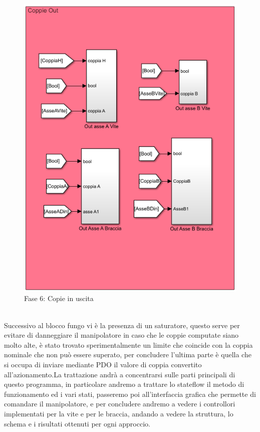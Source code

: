 \begin{figure}[ht]
	\begin{center}
		\includegraphics[scale=0.6]{Immagini/Sperimentale/CoppieOut}
		\caption{Fase 6: Copie in uscita
			\label{fig:Coppieout}}
	\end{center}
\end{figure}
\\Successivo al blocco fungo vi è la presenza di un saturatore, questo serve per evitare di danneggiare il manipolatore in caso che le coppie computate siano molto alte, è stato trovato sperimentalmente un limite che coincide con la coppia nominale che non può essere superato, per concludere l'ultima parte è quella che si occupa di inviare mediante PDO il valore di coppia convertito all'azionamento.La trattazione andrà a concentrarsi sulle parti principali di questo programma, in particolare andremo a trattare lo stateflow il metodo di funzionamento ed i vari stati, passeremo poi all'interfaccia grafica che permette di comandare il manipolatore, e per concludere andremo a vedere i controllori implementati per la vite e per le braccia, andando a vedere la struttura, lo schema e i risultati ottenuti per ogni approccio.
